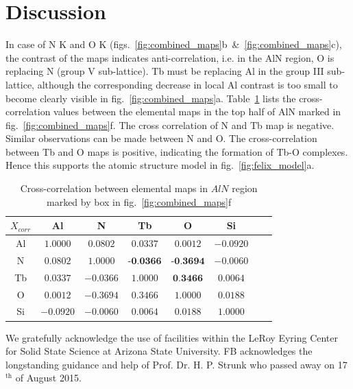 \documentclass[%
aip,
rsi,%
 amsmath,amssymb,%
 reprint,%
]{revtex4-1}
\begin{document}
\section{Discussion} %
\label{sec:discussion}
In case of N K and O K (figs.~\ref{fig:combined_maps}b~\&~\ref{fig:combined_maps}c), the contrast of the maps indicates anti-correlation, i.e. in the AlN region, O is replacing N (group V sub-lattice). Tb must be replacing Al in the group III sub-lattice, although the corresponding decrease in local Al contrast is too small to become clearly visible in fig.~\ref{fig:combined_maps}a. Table~\ref{tab:xcorr} lists the cross-correlation values between the elemental maps in the top half of AlN marked in fig.~\ref{fig:combined_maps}f. The cross correlation of N and Tb map is negative. Similar observations can be made between N and O. The cross-correlation between Tb and O maps is positive, indicating the formation of Tb-O complexes. Hence this supports the atomic structure model in fig.~\ref{fig:felix_model}a.
\begin{table}[h]
	\caption{Cross-correlation between elemental maps in $AlN$ region marked by box in fig.~\ref{fig:combined_maps}f}
    \label{tab:xcorr}
    \begin{ruledtabular}
    	\begin{tabular}{cccccccc}
        	$X_{corr}$&Al&N&Tb&O&Si													\\ \hline
            Al& $1.0000$& $0.0802$& $0.0337$& $0.0012$&$-0.0920$					\\
             N& $0.0802$& $1.0000$& $\textbf{-0.0366}$&$\textbf{-0.3694}$&$-0.0060$	\\
            Tb& $0.0337$&$-0.0366$& $1.0000$& $\textbf{0.3466}$&$0.0064$			\\
             O& $0.0012$&$-0.3694$&	$0.3466$& $1.0000$&$0.0188$						\\
            Si&$-0.0920$&$-0.0060$&$0.0064$&$0.0188$& $1.0000$
    	\end{tabular}
    \end{ruledtabular}
\end{table}

\begin{acknowledgments}
We gratefully acknowledge the use of facilities within the LeRoy Eyring Center for Solid State Science at Arizona State University. FB acknowledges the longstanding guidance and help of Prof. Dr. H. P. Strunk who passed away on 17$^\text{th}$ of August 2015.
\end{acknowledgments}

\end{document}
